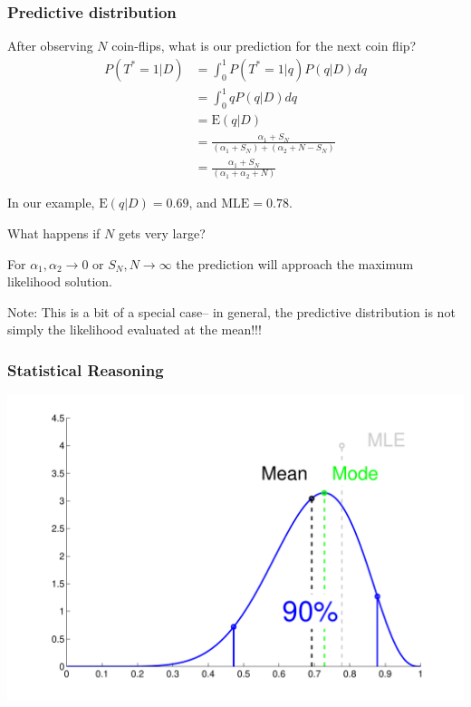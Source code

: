 \subsubsection{Predictive distribution}
\vspace{.5cm}
After observing $N$ coin-flips, what is our prediction for the next coin flip?
\begin{align}
P(T^*=1| D)&= \int_0^1 P(T^*=1|q) P(q|D) dq\\
& = \int_0^1 q P(q|D) dq\\
&= \mbox{E}(q|D) \\
&=\frac{\alpha_1+S_N}{(\alpha_1+ S_N)+(\alpha_{2}+N-S_N)}\\
&=\frac{\alpha_1+S_N}{(\alpha_1+\alpha_2+N)}
\end{align}

\vspace{.5cm}
In our example, $\mbox{E}(q|D)=0.69$, and $\mbox{MLE}=0.78$. 

\begin{bbbox}{What happens if $N$ gets very large?}

For $ \alpha_1,\alpha_2 \rightarrow 0$ or $ S_N , N \rightarrow \infty $ the prediction will approach the maximum likelihood solution.
\end{bbbox}

\vspace{.5cm}
Note: This is a bit of a special case-- in general, the predictive distribution is not simply the likelihood evaluated at the mean!!!


\subsubsection{Statistical Reasoning}
\includegraphics[width=\textwidth]{./lecture2/BetaPosteriorConfidence}


